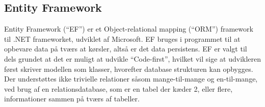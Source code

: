 \subsection{Entity Framework}
Entity Framework (``EF'') er et Object-relational mapping (``ORM'') framework til .NET frameworket, udviklet af Microsoft. \citep{EF}
EF bruges i programmet til at opbevare data på tværs at kørsler, altså er det data persistens. 
EF er valgt til dels grundet at det er muligt at udvikle ``Code-first'', hvilket vil sige at udvikleren først skriver modellen som klasser, hvorefter database strukturen kan opbygges. 
Der understøttes ikke trivielle relationer såsom mange-til-mange og en-til-mange, ved brug af en relationsdatabase, som er en tabel der kæder 2, eller flere, informationer sammen på tværs af tabeller.
